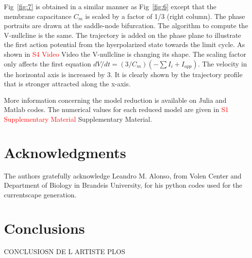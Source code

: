 Fig~\ref{fig:7} is obtained in a similar manner as Fig~\ref{fig:6} except that the membrane capacitance $C_m$ is scaled by a factor of 1/3 (right column).  The phase portraits are drawn at the saddle-node bifurcation. The algorithm to compute the V-nullcline is the same.  The trajectory is added on the phase plane to illustrate the first action potential from the hyerpolarized state towards the limit cycle.  As shown in \textcolor{red}{S4 Video} Video the V-nullcline is changing its shape. The scaling factor only affects the first equation $dV/dt = (3/C_m) (-\sum I_i + {I}_{app})$.  The velocity in the horizontal axis is increased by 3.  It is clearly shown by the trajectory profile that is stronger attracted along the x-axis.  

More information concerning the model reduction is available on Julia and Matlab codes. The numerical values for each reduced model are given in \textcolor{red}{S1 Supplementary Material} Supplementary Material.



\section{Acknowledgments}
The authors gratefully acknowledge Leandro M. Alonso, from Volen Center and Department of Biology in Brandeis University, for his python codes used for the currentscape generation. 


\section{Conclusions}

\begin{shaded}
    CONCLUSIOSN DE L ARTISTE PLOS
\end{shaded}